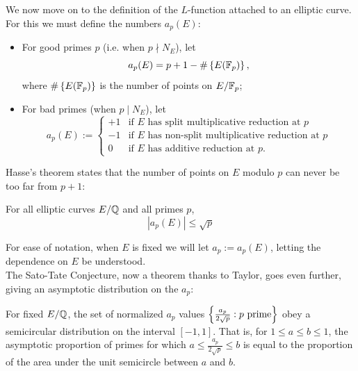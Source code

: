 We now move on to the definition of the $L$-function attached to an elliptic curve. For this we must define the numbers $a_p(E)$:
\begin{definition}\label{def:a_p} \mbox{}
\begin{itemize}
\item For good primes $p$ (i.e. when $p \nmid N_E$), let
\begin{equation}
a_p(E) = p+1-\#\left\{E(\mathbb{F}_p)\right\},
\end{equation}
where $\#\left\{E(\mathbb{F}_p)\right\}$ is the number of points on $E/\mathbb{F}_p$;
\item For bad primes (when $p \mid N_E$), let
\begin{equation}
a_p(E) := \begin{cases}
+1 & \text{if $E$ has split multiplicative reduction at $p$} \\
-1 & \text{if $E$ has non-split multiplicative reduction at $p$} \\
0 & \text{if $E$ has additive reduction at $p$.}
\end{cases}
\end{equation}
\end{itemize}
\end{definition}

Hasse's theorem states that the number of points on $E$ modulo $p$ can never be too far from $p+1$:
\begin{theorem}[Hasse, 1936]
For all elliptic curves $E/\mathbb{Q}$ and all primes $p$,
\begin{equation}
|a_p(E)| \le \sqrt{p}
\end{equation}
\end{theorem}

For ease of notation, when $E$ is fixed we will let $a_p := a_p(E)$, letting the dependence on $E$ be understood. \\

The Sato-Tate Conjecture, now a theorem thanks to Taylor, goes even further, giving an asymptotic distribution on the $a_p$:
\begin{theorem}[Taylor, 2006-]
For fixed $E/\mathbb{Q}$, the set of normalized $a_p$ values $\left\{\frac{a_p}{2\sqrt{p}}: p \text{ prime}\right\}$ obey a semicircular distribution on the interval $[-1,1]$. That is, for $1\le a \le b \le 1$, the asymptotic proportion of primes for which $a \le \frac{a_p}{2\sqrt{p}} \le b$ is equal to the proportion of the area under the unit semicircle between $a$ and $b$.
\end{theorem}

